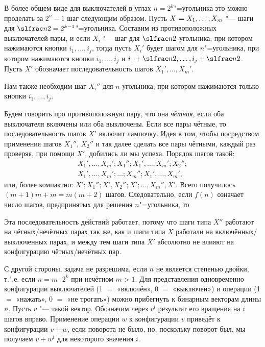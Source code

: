 \documentclass[twoside]{book}
\begin{document}
В более общем виде для выключателей в углах $n=2^k$"=угольника это можно проделать за $2^{n}-1$ шаг следующим образом.
Пусть $X\hm=X_1,\dots,X_m$ "--- шаги для $\slfrac n2=2^{k-1}$"=угольника.
Составим из противоположных выключателей пары, и если $X_i$ "--- шаг для $\slfrac n2$-угольника, при котором нажимаются кнопки $i_1,\dots,i_j$, тогда пусть $X_i'$ будет шагом для $n$"=угольника, при котором нажимаются кнопки $i_1,\dots,i_j$ и $i_1+\slfrac n2,\dots,i_j+\slfrac n2$.
Пусть $X'$ обозначает последовательность шагов $X_1',\dots,X_m'$.

Нам также необходим шаг $X_i''$ для $n$-угольника, при котором нажимаются только кнопки $i_1,\dots,i_j$.

Будем говорить про противоположную пару, что она \emph{чётная}, если оба выключателя включены или оба выключены.
Если все пары чётные, то последовательность шагов $X'$ включит лампочку.
Идея в том, чтобы посредством применения шагов $X_1''$, $X_2''$ и так далее сделать все пары чётными, каждый раз проверяя, при помощи $X'$, добились ли мы успеха.
Порядок шагов такой:
\begin{align*}
X_1',\dots,X_m';X_1'';X_1',\dots,X_m';X_2'';
\\
X_1',\dots,X_m';\dots ; X_m'';X_1',\dots,X_m',
\end{align*}
или, более компактно: $X';X_1'';X',X_2'';X';\dots,X_m'',X'$.
Всего получилось $(m+1)m+m=m(m+2)$ шагов.
Следовательно, если $f(n)$ означает число шагов, предпринятых для решения $n$"=угольника, то 

Эта последовательность действий работает, потому что шаги типа $X''$ работают на чётных/нечётных парах так же, как и шаги типа $X$ работали на включённых/выключенных парах, и между тем шаги типа $X'$ абсолютно не влияют на конфигурацию чётных/нечётных пар.
\heart

С другой стороны, задача не разрешима, если $n$ не является степенью двойки, т.",е. если $n=m\cdot 2^k$ при нечётном $m>1$.
Для представления одновременно конфигурации выключателей (1 $=$ «включён», 0 $=$ «выключен») и операции (1 $=$ «нажать», 0 $=$ «не трогать») можно прибегнуть к бинарным векторам длины $n$.
Пусть $v$ "--- такой вектор.
Обозначим через $v^i$ результат его вращения на $i$ шагов вправо.
Применение операции $w$ к конфигурации $v$ приведёт к конфигурации $v+w$, если поворота не было, но, поскольку поворот был, мы получаем $v+w^i$ для некоторого значения $i$.
\end{document}
